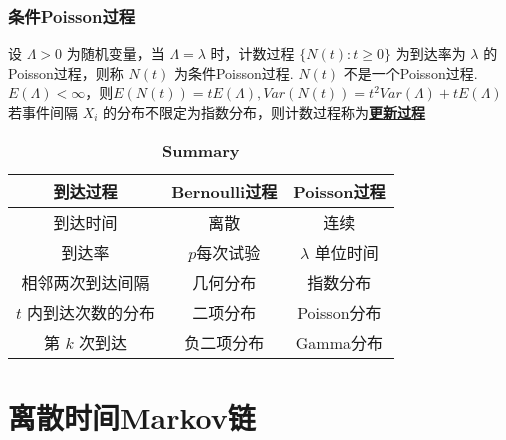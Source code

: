 \documentclass[./main.tex]{subfiles}
\begin{document}
\subsubsection{条件Poisson过程}
设 $\Lambda>0$ 为随机变量，当 $\Lambda=\lambda$ 时，计数过程 $\{N(t):t\ge 0\}$ 为到达率为 $\lambda$ 的Poisson过程，则称 $N(t)$ 为条件Poisson过程. $N(t)$ 不是一个Poisson过程. \\
$E(\Lambda)<\infty$，则$E(N(t))=tE(\Lambda),Var(N(t))=t^2Var(\Lambda)+tE(\Lambda)$\\
若事件间隔 $X_i$ 的分布不限定为指数分布，则计数过程称为\underline{\textbf{更新过程}}

\begin{table}[h]
    \centering
    \caption{\textbf{Summary}}
    \begin{tabular}{ccc}
        \toprule
        到达过程             & Bernoulli过程 & Poisson过程        \\
        \hline
        到达时间             & 离散          & 连续               \\
        \hline
        到达率               & $p$每次试验   & $\lambda$ 单位时间 \\
        \hline
        相邻两次到达间隔     & 几何分布      & 指数分布           \\
        \hline
        $t$ 内到达次数的分布 & 二项分布      & Poisson分布        \\
        \hline
        第 $k$ 次到达        & 负二项分布    & Gamma分布          \\
        \bottomrule
    \end{tabular}
\end{table}
\section{离散时间Markov链}
\end{document}

